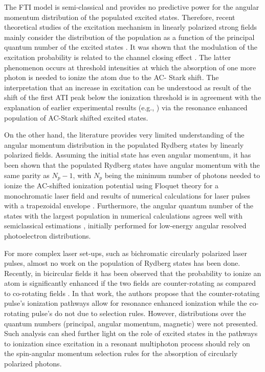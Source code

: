 The FTI model is semi-classical and provides no predictive power for the angular momentum distribution of the populated excited states. Therefore, recent theoretical studies of the excitation mechanism in linearly polarized strong fields mainly consider the distribution of the population as a function of the principal quantum number of the excited states \cite{li2014,li2014b,zimmermann2017,xiong2017,piraux2017}. It was shown that the modulation of the excitation probability is related to the channel closing effect \cite{krajewska2012,li2014,li2014b,piraux2017}. The latter phenomenon occurs at threshold intensities at which the absorption of one more photon is needed to ionize the atom due to the AC- Stark shift. The interpretation that an increase in excitation can be understood as result of the shift of the first ATI peak below the ionization threshold \cite{li2014,li2014b} is in agreement with the explanation of earlier experimental results (e.g., \cite{freeman1987,jones1992,rottke1994}) via the resonance enhanced population of AC-Stark shifted excited states. 

On the other hand, the literature provides very limited understanding of the angular momentum distribution in the populated Rydberg states by linearly polarized fields. Assuming the initial state has even angular momentum, it has been shown that the populated Rydberg states have angular momentum with the same parity as $N_p-1$, with $N_p$ being the minimum number of photons needed to ionize the AC-shifted ionization potential using Floquet theory for a monochromatic laser field \cite{krajewska2012} and results of numerical calculations for laser pulses with a trapezoidal envelope \cite{piraux2017}. Furthermore, the angular quantum number of the states with the largest population in numerical calculations \cite{li2014,li2014b,piraux2017} agrees well with semiclassical estimations \cite{arbo2008}, initially performed for low-energy angular resolved photoelectron distributions.

For more complex laser set-ups, such as bichromatic circularly polarized laser pulses, almost no work on the population of Rydberg states has been done. Recently, in bicircular fields it has been observed that the probability to ionize an atom is significantly enhanced if the two fields are counter-rotating as compared to co-rotating fields \cite{mancuso2016}.
In that work, the authors propose that the counter-rotating pulse's ionization pathways allow for resonance enhanced ionization while the co-rotating pulse's do not due to selection rules.
However, distributions over the quantum numbers (principal, angular momentum, magnetic) were not presented. Such analysis can shed further light on the role of excited states in the pathways to ionization since excitation in a resonant multiphoton process should rely on the spin-angular momentum selection rules for the absorption of circularly polarized photons.

